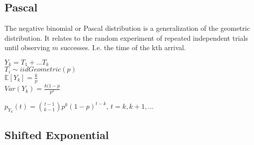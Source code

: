 \subsection*{Pascal}

The negative binomial or Pascal distribution is a generalization of the geometric distribution. It relates to the random experiment of repeated independent trials until observing $m$ successes. I.e. the time of the kth arrival.

$Y_k=T_1+...T_k$\\

$T_i \sim iid Geometric(p)$\\

$\mathbb{E}[Y_k]=\frac{k}{p}$\\

$Var(Y_k)= \frac{k(1-p}{p^2}$

$p_{Y_k}(t) ={\binom{t-1}{ k-1}}p^k(1-p)^{t-k}$, $t=k,k+1,...$


\subsection*{Shifted Exponential}

